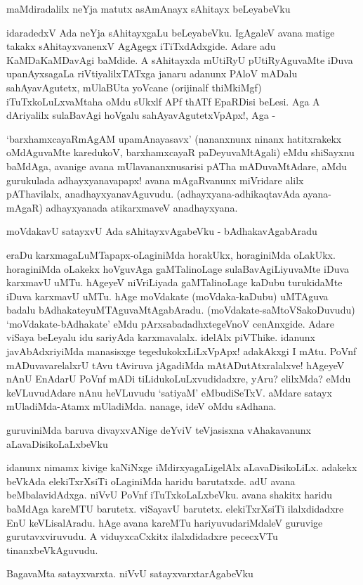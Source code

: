 maMdiradalilx neYja matutx asAmAnayx sAhitayx beLeyabeVku

idaradedxV Ada neYja sAhitayxgaLu beLeyabeVku. IgAgaleV avana matige takakx sAhitayxvanenxV AgAgegx iTiTxdAdxgide. Adare adu KaMDaKaMDavAgi baMdide. A sAhitayxda mUtiRyU pUtiRyAguvaMte iDuva upanAyxsagaLa riVtiyalilxTATxga janaru adanunx PAloV mADalu sahAyavAgutetx, mUlaBUta yoVcane (orijinalf thiMkiMgf) iTuTxkoLuLxvaMtaha oMdu sUkxlf APf thATf EpaRDisi beLesi. Aga A dAriyalilx sulaBavAgi hoVgalu sahAyavAgutetxVpApx!, Aga - 

`barxhamxcayaRmAgAM upamAnayasavx' (nananxnunx ninanx hatitxrakekx oMdAguvaMte karedukoV, barxhamxcayaR paDeyuvaMtAgali) eMdu shiSayxnu baMdAga, avanige avana mUlavananxnusarisi pATha mADuvaMtAdare, aMdu gurukulada adhayxyanavapapx! avana mAgaRvanunx miVridare alilx pAThavilalx, anadhayxyanavAguvudu. (adhayxyana-adhikaqtavAda ayana-mAgaR) adhayxyanada atikarxmaveV anadhayxyana.

moVdakavU satayxvU Ada sAhitayxvAgabeVku - bAdhakavAgabAradu

eraDu karxmagaLuMTapapx-oLaginiMda horakUkx, horaginiMda oLakUkx. horaginiMda oLakekx hoVguvAga gaMTalinoLage sulaBavAgiLiyuvaMte iDuva karxmavU uMTu. hAgeyeV niVriLiyada gaMTalinoLage kaDubu turukidaMte iDuva karxmavU uMTu. hAge moVdakate (moVdaka-kaDubu) uMTAguva badalu bAdhakateyuMTAguvaMtAgabAradu. (moVdakate-saMtoVSakoDuvudu) `moVdakate-bAdhakate' eMdu pArxsabadadhxtegeVnoV cenAnxgide. Adare viSaya beLeyalu idu sariyAda karxmavalalx. idelAlx piVThike. idanunx javAbAdxriyiMda manasisxge tegedukokxLiLxVpApx! adakAkxgi I mAtu. PoVnf mADuvavarelalxrU tAvu tAviruva jAgadiMda mAtADutAtxralalxve! hAgeyeV nAnU EnAdarU PoVnf mADi tiLidukoLuLxvudidadxre, yAru? elilxMda? eMdu keVLuvudAdare nAnu heVLuvudu `satiyaM' eMbudiSeTxV. aMdare satayx mUladiMda-Atamx mUladiMda. nanage, ideV oMdu sAdhana.

guruviniMda baruva divayxvANige deYviV teVjasisxna vAhakavanunx aLavaDisikoLaLxbeVku

idanunx nimamx kivige kaNiNxge iMdirxyagaLigelAlx aLavaDisikoLiLx. adakekx beVkAda elekiTxrXsiTi oLaginiMda haridu barutatxde. adU avana beMbalavidAdxga. niVvU PoVnf iTuTxkoLaLxbeVku. avana shakitx haridu baMdAga kareMTU barutetx. viSayavU barutetx. elekiTxrXsiTi ilalxdidadxre EnU keVLisalAradu. hAge avana kareMTu hariyuvudariMdaleV guruvige gurutavxviruvudu. A viduyxcaCxkitx ilalxdidadxre pececxVTu tinanxbeVkAguvudu.

BagavaMta satayxvarxta. niVvU satayxvarxtarAgabeVku

